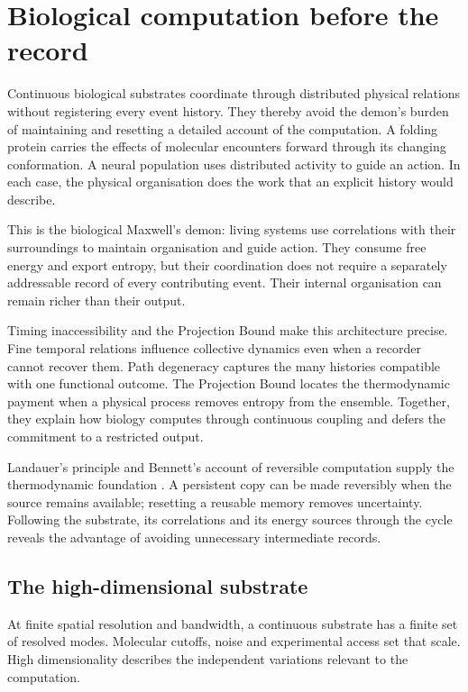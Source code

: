 \documentclass[10pt,a4paper,twocolumn]{article}
\numberwithin{equation}{section}
\begin{document}
\section{Biological computation before the record}

Continuous biological substrates coordinate through distributed physical relations without registering every event history. They thereby avoid the demon's burden of maintaining and resetting a detailed account of the computation. A folding protein carries the effects of molecular encounters forward through its changing conformation. A neural population uses distributed activity to guide an action. In each case, the physical organisation does the work that an explicit history would describe.

This is the biological Maxwell's demon: living systems use correlations with their surroundings to maintain organisation and guide action. They consume free energy and export entropy, but their coordination does not require a separately addressable record of every contributing event. Their internal organisation can remain richer than their output.

Timing inaccessibility and the Projection Bound make this architecture precise. Fine temporal relations influence collective dynamics even when a recorder cannot recover them. Path degeneracy captures the many histories compatible with one functional outcome. The Projection Bound locates the thermodynamic payment when a physical process removes entropy from the ensemble. Together, they explain how biology computes through continuous coupling and defers the commitment to a restricted output.

Landauer's principle and Bennett's account of reversible computation supply the thermodynamic foundation \cite{landauer1961,bennett1982}. A persistent copy can be made reversibly when the source remains available; resetting a reusable memory removes uncertainty. Following the substrate, its correlations and its energy sources through the cycle \cite{parrondo2015} reveals the advantage of avoiding unnecessary intermediate records.

\subsection{The high-dimensional substrate}

At finite spatial resolution and bandwidth, a continuous substrate has a finite set of resolved modes. Molecular cutoffs, noise and experimental access set that scale. High dimensionality describes the independent variations relevant to the computation.
\end{document}

